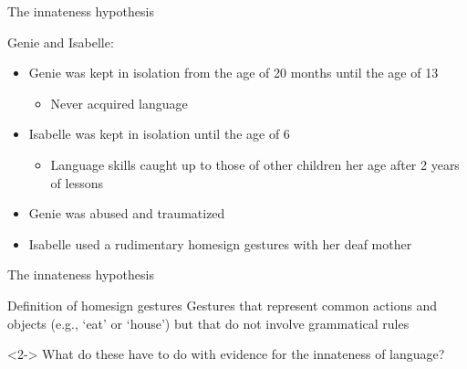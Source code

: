\documentclass{beamer}
\begin{document}
        \begin{frame}{The innateness hypothesis}
            \begin{example}
                Genie and Isabelle:
                \begin{itemize}
                    \item Genie was kept in isolation from the age of 20 months until the age of 13
                    \begin{itemize}
                        \item<2->[$\rightarrow$] Never acquired language
                    \end{itemize}
                    \item Isabelle was kept in isolation until the age of 6
                    \begin{itemize}
                        \item<2->[$\rightarrow$] Language skills caught up to those of other children her age after 2 years of lessons
                    \end{itemize}
                \end{itemize}
            \end{example}
            \begin{itemize}
                \item<4-> Genie was abused and traumatized
                \item<4-> Isabelle used a rudimentary \alert{homesign} gestures with her deaf mother
            \end{itemize}
        \end{frame}
        \begin{frame}{The innateness hypothesis}
            \begin{block}{Definition of \alert{homesign} gestures}
                Gestures that represent common actions and objects (e.g., `eat' or `house') but that do not involve grammatical rules
            \end{block}
            \begin{alertblock}<2->{}
                What do these have to do with evidence for the innateness of language?
            \end{alertblock}
        \end{frame}
\end{document}
